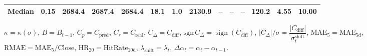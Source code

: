 \begin{threeparttable}
{\begin{tabular}{lrrrrrrrrrrrrr}
 Median &     0.15 & 2684.4 & 2687.4 & 2684.4 &       18.1 &                      1.0 &              2130.9 &         -- &        -- &             -- &            120.2 &            4.55 &                  10.00 \\
\bottomrule
\end{tabular}
}%
\begin{tablenotes}\footnotesize
\item $\kappa=\kappa(\sigma)$, $B=B_{t-1}$, $C_p=C_{\text{pred}}$, $C_r=C_{\text{real}}$, $C_\Delta=C_{\text{diff}}$, $\mathrm{sgn}\,C_\Delta=\operatorname{sign}(C_{\text{diff}})$, $|C_\Delta|/\sigma=\dfrac{|C_{\text{diff}}|}{\sigma_t^{\text{shift}}}$, $\mathrm{MAE}_5=\mathrm{MAE}_{5\text{d}}$, $\mathrm{RMAE}= \mathrm{MAE}_5 / \text{Close}$, $\mathrm{HR}_{20}=\mathrm{HitRate}_{20\text{d}}$, 
$\lambda_{\text{shift}}=\lambda_t$, 
$\Delta\alpha_t=\alpha_t-\alpha_{t-1}$.
\end{tablenotes}
\end{threeparttable}
\endgroup